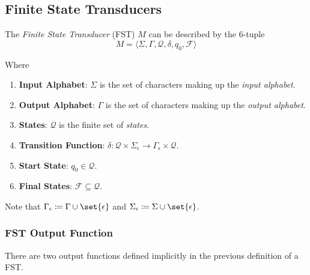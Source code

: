 
\subsection{Finite State Transducers}

\begin{definition}
    The \textit{Finite State Transducer} (FST) $M$ can be described by the 6-tuple
    \begin{equation}
        M = \langle
            \Sigma,
            \Gamma,
            \mathcal{Q},
            \delta,
            q_0,
            \mathcal{F}
        \rangle
    \end{equation}
    
    Where
    \begin{enumerate}
        \item \textbf{Input Alphabet}: $\Sigma$ is the set of characters making up the \textit{input alphabet}.
        \item \textbf{Output Alphabet}: $\Gamma$ is the set of characters making up the \textit{output alphabet}.
        \item \textbf{States}: $\mathcal{Q}$ is the finite set of \textit{states}.
        \item \textbf{Transition Function}: $\delta \colon \mathcal{Q} \times \Sigma_{\epsilon} \to \Gamma_{\epsilon} \times \mathcal{Q}$.
        \item \textbf{Start State}: $q_0 \in \mathcal{Q}$.
        \item \textbf{Final States}: $\mathcal{F} \subseteq \mathcal{Q}$.
    \end{enumerate}
    
    Note that $\Gamma_{\epsilon} \coloneqq \Gamma \cup \set{\epsilon}$ and $\Sigma_{\epsilon} \coloneqq \Sigma \cup \set{\epsilon}$.
\end{definition}

\subsubsection{FST Output Function}

There are two output functions defined implicitly in the previous definition of a FST.

